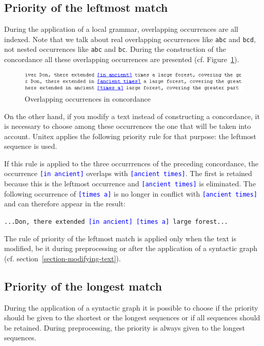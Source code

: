 \subsection{Priority of the leftmost match}
 
During the application of a local grammar, overlapping occurrences
are all indexed. Note that we talk about real overlapping occurrences like
\verb+abc+ and \verb+bcd+, not nested occurrences like \verb+abc+ and
\verb+bc+. During the construction of the concordance all these overlapping 
occurrences are presented (cf. Figure~\ref{fig-overlappping-occurrences}).

\begin{figure}[!h]
\begin{center}
\includegraphics[width=13cm]{resources/img/fig6-24.png}
\caption{Overlapping occurrences in concordance\label{fig-overlappping-occurrences}}
\end{center}
\end{figure}

\noindent On the other hand, if you modify a text instead of constructing a
concordance, it is necessary to choose among these occurrences the one  that will be taken into account.
Unitex applies the following priority rule for that purpose: the leftmost
sequence is used.

\bigskip
\noindent If this rule is applied to the three occurrrences of the preceding
concordance, the occurrence \textcolor{blue}{\texttt{[in ancient]}} overlaps with
\textcolor{blue}{\texttt{[ancient times]}}. The first  is retained because this
is the leftmost occurrence and \textcolor{blue}{\texttt{[ancient times]}} is
eliminated. The following occurrence of \textcolor{blue}{\texttt{[times a]}} is
no longer in conflict with \textcolor{blue}{\texttt{[ancient times]}} and can
therefore appear in the result:
\begin{center}
\texttt{...Don, there extended \textcolor{blue}{[in ancient] [times a]} large forest...}
\end{center}

\noindent The rule of priority of the leftmost match is applied only when the
text is modified, be it during preprocessing or after the application of a syntactic
graph (cf. section~\ref{section-modifying-text}).

\subsection{Priority of the longest match}
During the application of a syntactic graph it is possible to choose if the
priority should be given to the shortest or the longest sequences or if all
sequences should be retained. During preprocessing, the priority is always given
to the longest sequences.


